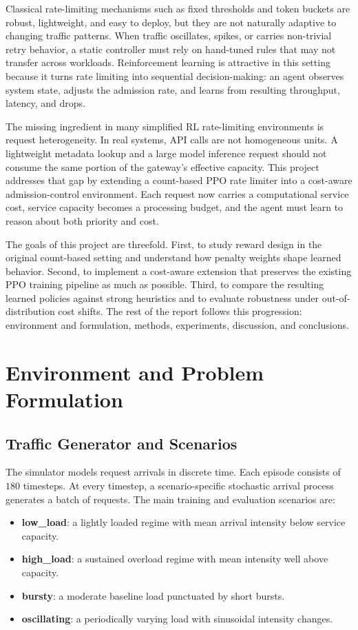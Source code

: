 \documentclass[conference]{IEEEtran}
\begin{document}
Classical rate-limiting mechanisms such as fixed thresholds and token buckets are robust, lightweight, and easy to deploy, but they are not naturally adaptive to changing traffic patterns. When traffic oscillates, spikes, or carries non-trivial retry behavior, a static controller must rely on hand-tuned rules that may not transfer across workloads. Reinforcement learning is attractive in this setting because it turns rate limiting into sequential decision-making: an agent observes system state, adjusts the admission rate, and learns from resulting throughput, latency, and drops.

The missing ingredient in many simplified RL rate-limiting environments is request heterogeneity. In real systems, API calls are not homogeneous units. A lightweight metadata lookup and a large model inference request should not consume the same portion of the gateway's effective capacity. This project addresses that gap by extending a count-based PPO rate limiter into a cost-aware admission-control environment. Each request now carries a computational service cost, service capacity becomes a processing budget, and the agent must learn to reason about both priority and cost.

The goals of this project are threefold. First, to study reward design in the original count-based setting and understand how penalty weights shape learned behavior. Second, to implement a cost-aware extension that preserves the existing PPO training pipeline as much as possible. Third, to compare the resulting learned policies against strong heuristics and to evaluate robustness under out-of-distribution cost shifts. The rest of the report follows this progression: environment and formulation, methods, experiments, discussion, and conclusions.

\section{Environment and Problem Formulation}
\subsection{Traffic Generator and Scenarios}
The simulator models request arrivals in discrete time. Each episode consists of $180$ timesteps. At every timestep, a scenario-specific stochastic arrival process generates a batch of requests. The main training and evaluation scenarios are:

\begin{itemize}[leftmargin=1.5em]
    \item \textbf{low\_load}: a lightly loaded regime with mean arrival intensity below service capacity.
    \item \textbf{high\_load}: a sustained overload regime with mean intensity well above capacity.
    \item \textbf{bursty}: a moderate baseline load punctuated by short bursts.
    \item \textbf{oscillating}: a periodically varying load with sinusoidal intensity changes.
\end{itemize}
\end{document}
